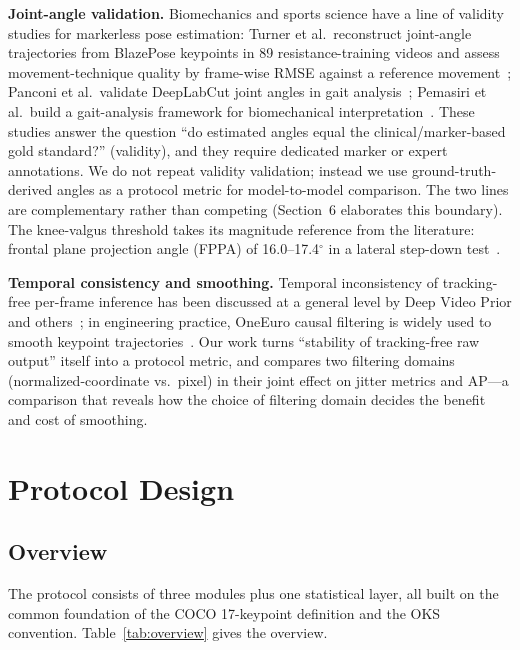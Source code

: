 \documentclass[10pt,conference]{IEEEtran}
\begin{document}
\textbf{Joint-angle validation.} Biomechanics and sports science have a line of validity studies for markerless pose estimation: Turner et al.\ reconstruct joint-angle trajectories from BlazePose keypoints in 89 resistance-training videos and assess movement-technique quality by frame-wise RMSE against a reference movement~\cite{4}; Panconi et al.\ validate DeepLabCut joint angles in gait analysis~\cite{5}; Pemasiri et al.\ build a gait-analysis framework for biomechanical interpretation~\cite{6}. These studies answer the question ``do estimated angles equal the clinical/marker-based gold standard?'' (validity), and they require dedicated marker or expert annotations. We do not repeat validity validation; instead we use ground-truth-derived angles as a protocol metric for model-to-model comparison. The two lines are complementary rather than competing (Section~6 elaborates this boundary). The knee-valgus threshold takes its magnitude reference from the literature: frontal plane projection angle (FPPA) of 16.0--17.4$^{\circ}$ in a lateral step-down test~\cite{11}.

\textbf{Temporal consistency and smoothing.} Temporal inconsistency of tracking-free per-frame inference has been discussed at a general level by Deep Video Prior and others~\cite{12}; in engineering practice, OneEuro causal filtering is widely used to smooth keypoint trajectories~\cite{13}. Our work turns ``stability of tracking-free raw output'' itself into a protocol metric, and compares two filtering domains (normalized-coordinate vs.\ pixel) in their joint effect on jitter metrics and AP---a comparison that reveals how the choice of filtering domain decides the benefit and cost of smoothing.

\section{Protocol Design}

\subsection{Overview}

The protocol consists of three modules plus one statistical layer, all built on the common foundation of the COCO 17-keypoint definition and the OKS convention. Table~\ref{tab:overview} gives the overview.
\end{document}
